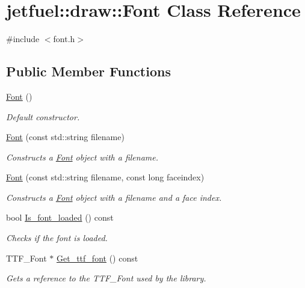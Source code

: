 \hypertarget{classjetfuel_1_1draw_1_1Font}{}\section{jetfuel\+:\+:draw\+:\+:Font Class Reference}
\label{classjetfuel_1_1draw_1_1Font}


{\ttfamily \#include $<$font.\+h$>$}

\subsection*{Public Member Functions}
\begin{DoxyCompactItemize}
\item 
\hyperlink{classjetfuel_1_1draw_1_1Font_a1054eb031ce0e8485f828f5ae7463770}{Font} ()
\begin{DoxyCompactList}\small\item\em Default constructor. \end{DoxyCompactList}\item 
\hyperlink{classjetfuel_1_1draw_1_1Font_a96db43b28c32511ff481502ec8d11fd7}{Font} (const std\+::string filename)
\begin{DoxyCompactList}\small\item\em Constructs a \hyperlink{classjetfuel_1_1draw_1_1Font}{Font} object with a filename. \end{DoxyCompactList}\item 
\hyperlink{classjetfuel_1_1draw_1_1Font_a5907cc1ecc14725d642ef5c3c753ced9}{Font} (const std\+::string filename, const long faceindex)
\begin{DoxyCompactList}\small\item\em Constructs a \hyperlink{classjetfuel_1_1draw_1_1Font}{Font} object with a filename and a face index. \end{DoxyCompactList}\item 
bool \hyperlink{classjetfuel_1_1draw_1_1Font_a23a8e0aed90fac334f939d1b10864976}{Is\+\_\+font\+\_\+loaded} () const
\begin{DoxyCompactList}\small\item\em Checks if the font is loaded. \end{DoxyCompactList}\item 
T\+T\+F\+\_\+\+Font $\ast$ \hyperlink{classjetfuel_1_1draw_1_1Font_aa6583c70e9b801b16dc78ca3a156bc97}{Get\+\_\+ttf\+\_\+font} () const
\begin{DoxyCompactList}\small\item\em Gets a reference to the T\+T\+F\+\_\+\+Font used by the library. \end{DoxyCompactList}\item 

\end{DoxyCompactItemize}
